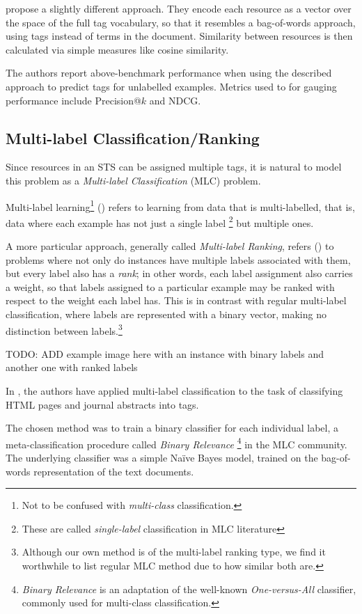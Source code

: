 \cite{auyeung_etal_2009} propose a slightly different approach. They encode each resource as a vector over the space of the full tag vocabulary, so that it resembles a bag-of-words approach, using tags instead of terms in the document. Similarity between resources is then calculated via simple measures like cosine similarity.

The authors report above-benchmark performance when using the described approach to predict tags for unlabelled examples. Metrics used to for gauging performance include Precision@$k$ and NDCG.


\subsection{Multi-label Classification/Ranking}

Since resources in an STS can be assigned multiple tags, it is natural to model this problem as a \textit{Multi-label Classification} (MLC) problem.

Multi-label learning\footnote{Not to be confused with \textit{multi-class} classification.} (\cite{tsoumakas_katakis_2007}) refers to learning from data that is multi-labelled, that is, data where each example has not just a single label \footnote{These are called \textit{single-label} classification in MLC literature} but multiple ones.

A more particular approach, generally called \textit{Multi-label Ranking}, refers (\cite{illig_etal_2011}) to problems where not only do instances have multiple labels associated with them, but every label also has a \textit{rank}; in other words, each label assignment also carries a weight, so that labels assigned to a particular example may be ranked with respect to the weight each label has. This is in contrast with regular multi-label classification, where labels are represented with a binary vector, making no distinction between labels.\footnote{Although our own method is of the multi-label ranking type, we find it worthwhile to list regular MLC method due to how similar both are.}

{\color{red} TODO: ADD example image here with an instance with binary labels and another one with ranked labels}

In \cite{katakis_etal_2008}, the authors have applied multi-label classification to the task of classifying HTML pages and journal abstracts into tags.

The chosen method was to train a binary classifier for each individual label, a meta-classification procedure called \textit{Binary Relevance} \footnote{\textit{Binary Relevance} is an adaptation of the well-known \textit{One-versus-All} \citep{rifkin_klautau_2004} classifier, commonly used for multi-class classification.} in the MLC community. The underlying classifier was a simple Naïve Bayes model, trained on the bag-of-words representation of the text documents.

